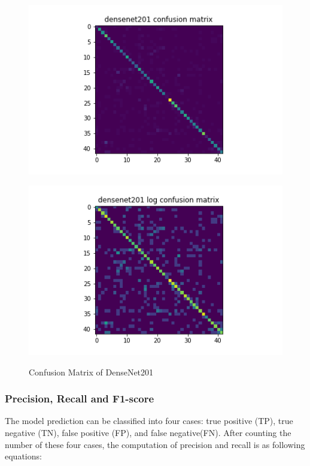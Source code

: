 \begin{figure}[t]
\begin{minipage}[b]{.5\linewidth}
    {\includegraphics[width=1.2\textwidth]{figs/conf_matrix/densenet201_conf.png}}
  \end{minipage}
  \hfill
  \begin{minipage}[b]{.5\linewidth}
    \centering

    {\includegraphics[width=1.2\textwidth]{figs/conf_matrix/densenet201_log_conf.png}}
  \end{minipage}


  \caption{Confusion Matrix of DenseNet201}
  \label{fig:densenet201_conf}
  \vspace{0.2in}
\end{figure}

\subsubsection{Precision, Recall and F1-score}
The model prediction can be classified into four cases: true positive (TP), true negative (TN), false positive (FP), and false negative(FN). After counting the number of these four cases, the computation of precision and recall is as following equations:


